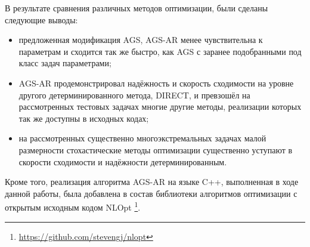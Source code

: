 В результате сравнения различных методов оптимизации, были сделаны следующие выводы:
\begin{itemize}
  \item предложенная модификация AGS, AGS-AR менее чувствительна к параметрам и сходится так же быстро, как AGS
  с заранее подобранными под класс задач параметрами;
  \item AGS-AR продемонстрировал надёжность и скорость сходимости на уровне другого детерминированного метода, DIRECT,
  и превзошёл на рассмотренных тестовых задачах многие другие методы, реализации которых так же доступны в исходных кодах;
  \item на рассмотренных существенно многоэкстремальных задачах малой размерности стохастические методы оптимизации
  существенно уступают в скорости сходимости и надёжности детерминированным.
\end{itemize}

Кроме того, реализация алгоритма AGS-AR на языке C++, выполненная в ходе данной работы, была добавлена в состав библиотеки
алгоритмов оптимизации с открытым исходным кодом NLOpt \footnote{\url{https://github.com/stevengj/nlopt}}.
